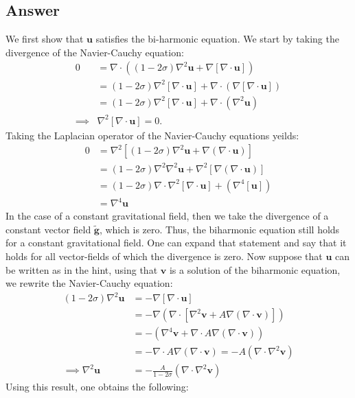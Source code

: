 \documentclass{article}
\newcommand{\laplace}{\nabla^2}
\begin{document}
\subsection*{Answer}
We first show that $\mathbf{u}$ satisfies the bi-harmonic equation. We start by taking the divergence of the Navier-Cauchy equation:
\begin{align*}
    0 &= \nabla\cdot\left((1-2\sigma)\laplace\mathbf{u} + \nabla\left[\nabla\cdot \mathbf{u}\right]\right)\\
    &= (1-2\sigma)\laplace\left[\nabla\cdot\mathbf{u}\right] + \nabla\cdot\left(\nabla\left[\nabla\cdot \mathbf{u}\right]\right)\\
    &= (1-2\sigma)\laplace\left[\nabla\cdot\mathbf{u}\right] + \nabla\cdot\left(\laplace\mathbf{u}\right)\\
    \implies& \laplace\left[\nabla\cdot\mathbf{u}\right] = 0.
\end{align*}Taking the Laplacian operator of the Navier-Cauchy equations yeilds:
\begin{align*}
    0 &= \laplace\left[(1-2\sigma)\laplace\mathbf{u} + \nabla\left(\nabla\cdot \mathbf{u}\right)\right]\\
    &= (1-2\sigma)\laplace\laplace\mathbf{u} + \laplace\left[\nabla\left(\nabla\cdot \mathbf{u}\right)\right]\\
    &= (1-2\sigma)\nabla\cdot\laplace\left[\nabla\cdot\mathbf{u}\right] + \left(\nabla^4\left[\mathbf{u}\right]\right)\\
    &= \nabla^4\mathbf{u}
\end{align*} In the case of a constant gravitational field, then we take the divergence of a constant vector field $\tilde{\mathbf{g}}$, which is zero. Thus, the biharmonic equation still holds for a constant gravitational field.
One can expand that statement and say that it holds for all vector-fields of which the divergence is zero.
Now suppose that $\mathbf{u}$ can be written as in the hint, using that $\mathbf{v}$ is a solution of the biharmonic equation, we rewrite the Navier-Cauchy equation:
\begin{align*}
    (1-2\sigma)\laplace{\mathbf{u}} &=- \nabla\left[\nabla\cdot\mathbf{u}\right]\\
    &= -\nabla\left(\nabla\cdot\left[\laplace{\mathbf{v}} + A\nabla\left(\nabla\cdot\mathbf{v}\right)\right]\right)\\
    &= -\left(\nabla^4\mathbf{v} + \nabla\cdot A\nabla(\nabla\cdot\mathbf{v})\right)\\
    &= -\nabla\cdot A\nabla(\nabla\cdot\mathbf{v}) = -A\left(\nabla\cdot\laplace\mathbf{v}\right)\\
    \implies \laplace{\mathbf{u}} &= -\frac{A}{1-2\sigma}\left(\nabla\cdot\laplace\mathbf{v}\right)
\end{align*}Using this result, one obtains the following:
\end{document}
